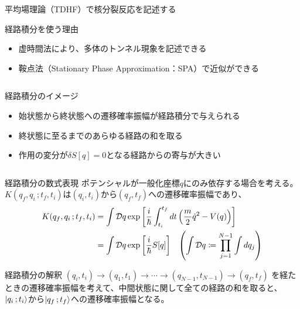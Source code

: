 \documentclass[14pt,aspectratio=169,xcolor=dvipsnames,table,dvipdfmx]{beamer}
\theoremstyle{definition}
\begin{document}
\begin{frame}{平均場理論（TDHF）で核分裂反応を記述する}
  \begin{block}{経路積分を使う理由}
    \begin{itemize}
      \item 虚時間法により、多体のトンネル現象を記述できる
      \item 鞍点法（Stationary Phase Approximation：SPA）で近似ができる
    \end{itemize}
  \end{block}
  \begin{columns}[t]
    \begin{column}{.53\textwidth}
      \vspace{-5mm}
      \begin{exampleblock}{経路積分のイメージ}
        \begin{itemize}
          \item 始状態から終状態への遷移確率振幅が経路積分で与えられる
          \item 終状態に至るまでのあらゆる経路の和を取る
          \item 作用の変分が$\delta S[q]=0$となる経路からの寄与が大きい
        \end{itemize}
      \end{exampleblock}
    \end{column}
    \begin{column}{.44\textwidth}
    \end{column}
  \end{columns}

\end{frame}


\begin{frame}{経路積分の数式表現}
  ポテンシャルが一般化座標$q$にのみ依存する場合を考える。\\
  $K(q_f,q_i\,;t_f,t_i)$は$(q_i,t_i)$から$(q_f,t_f)$への遷移確率振幅であり、
  \begin{align*}
    K(q_f,q_i\,;t_f,t_i) & = \int\mathcal{D}q
    \exp\qty[\frac{i}{\hbar}\int_{t_i}^{t_f}dt\,\qty(\frac{m}{2}\dot{q}^2 - V(q))]                                                            \\
                         & = \int\mathcal{D}q\exp\qty[\frac{i}{\hbar}S[q]]\quad \qty(\int \mathcal{D}q \coloneqq \prod_{j=1}^{N-1} \int dq_j)
  \end{align*}
  \begin{block}{経路積分の解釈}
    $(q_i,t_i)\to(q_1,t_1)\to\cdots\to(q_{N-1},t_{N-1})\to(q_f,t_f)$
    を経たときの遷移確率振幅を考えて、中間状態に関して全ての経路の和を取ると、\\
    $\ket{q_i\,;t_i}$から$\ket{q_f\,;t_f}$への遷移確率振幅となる。
  \end{block}
\end{frame}
\end{document}
